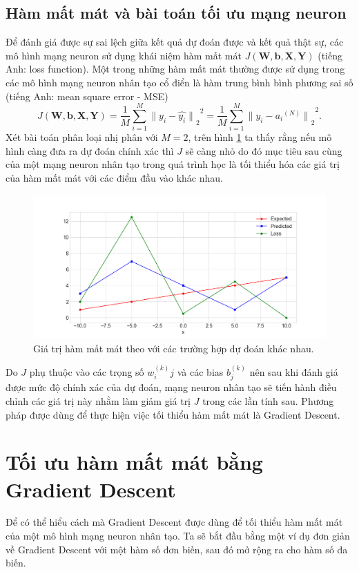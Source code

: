\subsection{Hàm mất mát và bài toán tối ưu mạng neuron}
Để đánh giá được sự sai lệch giữa kết quả dự đoán được và kết quả thật sự, các mô hình mạng neuron sử dụng khái niệm hàm mất mát $J\left(
		{\boldsymbol{W}},{\boldsymbol{b}},{\boldsymbol{X}},{\boldsymbol{Y}}
	\right)$ 
(tiếng Anh: loss function). Một trong những hàm mất mát thường được sử dụng trong các mô hình mạng neuron nhân tạo cổ điển là hàm trung bình bình phương sai số (tiếng Anh: mean square error - MSE)
\begin{equation}
	J
	\left(
		{\boldsymbol{W}},{\boldsymbol{b}},{\boldsymbol{X}},{\boldsymbol{Y}}
	\right)
	=
	{
		{\frac{1}{M}} 
		{\sum_{i=1}^{M}} 
		{ { {\parallel} y_i - \widehat{y_i} {\parallel} }_2 }^2
	}
	=
	{
		{\frac{1}{M}} 
		{\sum_{i=1}^{M}} 
		{ { {\parallel} y_i - {a_i}^{(N)} {\parallel} }_2 }^2
	}.
\end{equation}
Xét bài toán phân loại nhị phân với $M=2$, trên hình \ref{fig:loss_function} ta thấy rằng nếu mô hình càng đưa ra dự đoán chính xác thì $J$ sẽ càng nhỏ do đó mục tiêu sau cùng của một mạng neuron nhân tạo trong quá trình học là tối thiểu hóa các giá trị của hàm mất mát với các điểm đầu vào khác nhau.
\begin{figure}[ht!]
	\centerline{\includegraphics[scale=0.4]{images/loss_function.png}}
  	\caption{Giá trị hàm mất mát theo với các trường hợp dự đoán khác nhau.}
  	\label{fig:loss_function}
\end{figure}
Do $J$ phụ thuộc vào các trọng số $w^{(k)}_ij$ và các bias $b^{(k)}_j$ nên sau khi đánh giá được mức độ chính xác của dự đoán, mạng neuron nhân tạo sẽ tiến hành điều chỉnh các giá trị này nhằm làm giảm giá trị $J$ trong các lần tính sau. Phương pháp được dùng để thực hiện việc tối thiểu hàm mất mát là Gradient Descent.
\section{Tối ưu hàm mất mát bằng Gradient Descent}
Để có thể hiểu cách mà Gradient Descent được dùng để tối thiểu hàm mất mát của một mô hình mạng neuron nhân tạo. Ta sẽ bắt đầu bằng một ví dụ đơn giản về Gradient Descent với một hàm số đơn biến, sau đó mở rộng ra cho hàm số đa biến.
